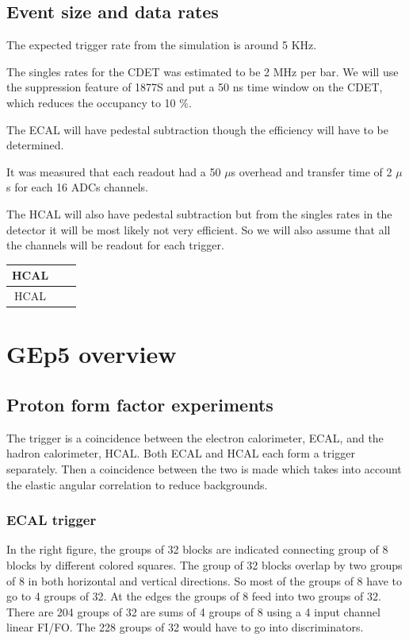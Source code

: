 \documentclass{article}
\begin{document}
\subsection{Event size and data rates}

The expected trigger rate from the simulation is around 5 KHz.

The singles rates for the CDET was estimated to be 2 MHz per bar. We will use the suppression feature of 1877S and put a 50 ns time window on the CDET, which reduces the occupancy to 10 \%.

The ECAL will have pedestal subtraction though the efficiency will have to be determined.

It was measured that each readout had a 50 $\mu$s overhead and transfer time of 2 $\mu$s for each 16 ADCs channels. 

The HCAL will also have pedestal subtraction but from the singles rates in the detector it will be most likely not very efficient.
So we will also assume that all the channels will be readout for each trigger.

\begin{tabular}{|c|c|c|}
\hline
HCAL&&\\
\hline
HCAL&&\\
\hline
\end{tabular}

\section{GEp5 overview}

\subsection{Proton form factor experiments}
The trigger is a coincidence between the electron calorimeter, ECAL,  and the hadron calorimeter, HCAL.
Both ECAL and HCAL each form a trigger separately. Then a coincidence between the two is made which
takes into account the elastic angular correlation to reduce backgrounds.

\subsubsection{ECAL trigger}
\label{sec:ecal-trig}
 In the right   figure, the groups of 32 blocks are indicated connecting
group of 8 blocks by different colored squares. The group of 32 blocks overlap
by two groups of 8 in both horizontal and vertical directions. So most of the
groups of 8 have to go to 4 groups of 32. At the edges the groups of 8 feed into
two groups of 32. There are 204  groups of 32 are sums of 4 groups of 8 using
a 4 input channel linear FI/FO. The 228 groups of 32 would have to
go into discriminators.
\end{document}
